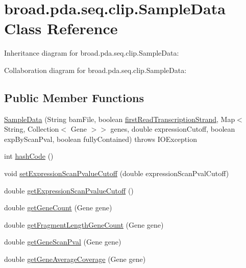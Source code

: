 \hypertarget{classbroad_1_1pda_1_1seq_1_1clip_1_1_sample_data}{\section{broad.\+pda.\+seq.\+clip.\+Sample\+Data Class Reference}
\label{classbroad_1_1pda_1_1seq_1_1clip_1_1_sample_data}
}


Inheritance diagram for broad.\+pda.\+seq.\+clip.\+Sample\+Data\+:


Collaboration diagram for broad.\+pda.\+seq.\+clip.\+Sample\+Data\+:
\subsection*{Public Member Functions}
\begin{DoxyCompactItemize}
\item 
\hyperlink{classbroad_1_1pda_1_1seq_1_1clip_1_1_sample_data_adcfd7ff578f7f31b52d759171e966003}{Sample\+Data} (String bam\+File, boolean \hyperlink{classbroad_1_1pda_1_1seq_1_1clip_1_1_sample_data_a8bd77375c425d2175f5e63a85120b244}{first\+Read\+Transcription\+Strand}, Map$<$ String, Collection$<$ Gene $>$$>$ genes, double expression\+Cutoff, boolean exp\+By\+Scan\+Pval, boolean fully\+Contained)  throws I\+O\+Exception 
\item 
int \hyperlink{classbroad_1_1pda_1_1seq_1_1clip_1_1_sample_data_afec94a7510b50e455bc60c11c6ddc2ff}{hash\+Code} ()
\item 
void \hyperlink{classbroad_1_1pda_1_1seq_1_1clip_1_1_sample_data_a3f9e817ce92fd84f2b5756bdb5b97c36}{set\+Expression\+Scan\+Pvalue\+Cutoff} (double expression\+Scan\+Pval\+Cutoff)
\item 
double \hyperlink{classbroad_1_1pda_1_1seq_1_1clip_1_1_sample_data_ab1d89f168632a45a362704dafdbdc13c}{get\+Expression\+Scan\+Pvalue\+Cutoff} ()
\item 
double \hyperlink{classbroad_1_1pda_1_1seq_1_1clip_1_1_sample_data_ad90b439a428d5cf25c496d69b49437a4}{get\+Gene\+Count} (Gene gene)
\item 
double \hyperlink{classbroad_1_1pda_1_1seq_1_1clip_1_1_sample_data_acacdbc70e2771b904d9611b653f18c28}{get\+Fragment\+Length\+Gene\+Count} (Gene gene)
\item 
double \hyperlink{classbroad_1_1pda_1_1seq_1_1clip_1_1_sample_data_aed882cc54637ce63c7c00e014fcd40cd}{get\+Gene\+Scan\+Pval} (Gene gene)
\item 
double \hyperlink{classbroad_1_1pda_1_1seq_1_1clip_1_1_sample_data_ae3f4ea198ba9415c26448706f02177bf}{get\+Gene\+Average\+Coverage} (Gene gene)
$$
\end{DoxyCompactItemize}
